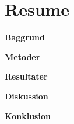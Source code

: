 \chapter*{Resume}
\textbf{Baggrund}

\textbf{Metoder}

\textbf{Resultater}

\textbf{Diskussion}

\textbf{Konklusion}